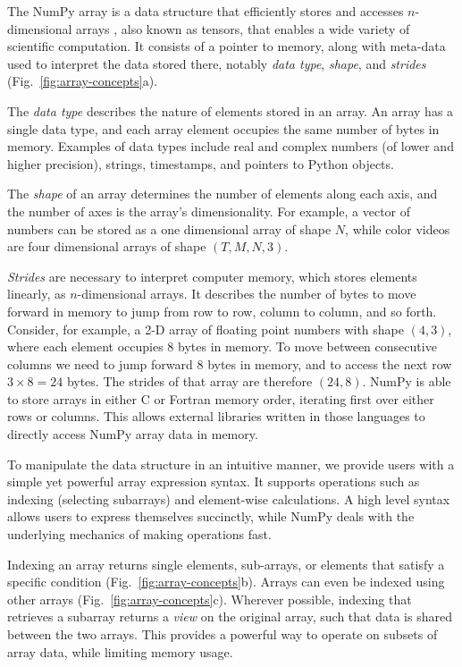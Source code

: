 The NumPy array is a data structure that efficiently stores and accesses
$n$-dimensional arrays \cite{vanderwalt2011numpy}, also known as tensors, that
enables a wide variety of scientific computation.
It consists of a pointer to memory, along with meta-data used to interpret the
data stored there, notably {\em data type}, {\em shape}, and {\em strides}
(Fig.~\ref{fig:array-concepts}a).

The {\em data type} describes the nature of elements stored in an array.
An array has a single data type, and each array element occupies the same
number of bytes in memory.
Examples of data types include real and complex numbers (of lower and higher
precision), strings, timestamps, and pointers to Python objects.

The {\em shape} of an array determines the number of elements along each axis,
and the number of axes is the array's dimensionality.
For example, a vector of numbers can be stored as a one dimensional array of
shape $N$, while color videos are four dimensional arrays of shape
$(T, M, N, 3)$.

{\em Strides} are necessary to interpret computer memory, which stores elements
linearly, as $n$-dimensional arrays.
It describes the number of bytes to move forward in memory to jump from row to
row, column to column, and so forth.
Consider, for example, a 2-D array of floating point numbers with shape
$(4, 3)$, where each element occupies 8 bytes in memory.
To move between consecutive columns we need to jump forward 8 bytes in memory,
and to access the next row $3 \times 8 = 24$ bytes.
The strides of that array are therefore $(24, 8)$.  NumPy is able to
store arrays in either C or Fortran memory order, iterating
first over either rows or columns.  This allows external libraries
written in those languages to directly access NumPy array data in memory.

To manipulate the data structure in an intuitive manner, we provide users with
a simple yet powerful array expression syntax.
It supports operations such as indexing (selecting subarrays) and element-wise
calculations.
A high level syntax allows users to express themselves succinctly, while NumPy
deals with the underlying mechanics of making operations fast.

Indexing an array returns single elements, sub-arrays, or elements that satisfy
a specific condition (Fig.~\ref{fig:array-concepts}b).
Arrays can even be indexed using other arrays (Fig.~\ref{fig:array-concepts}c).
Wherever possible, indexing that retrieves a subarray returns a {\em view} on
the original array, such that data is shared between the two arrays.
This provides a powerful way to operate on subsets of array data, while
limiting memory usage.

